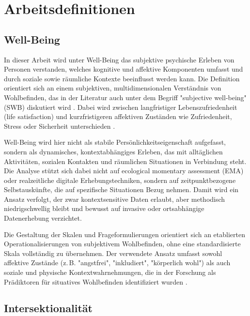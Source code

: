 \section*{Arbeitsdefinitionen}

\subsection*{Well-Being}

In dieser Arbeit wird unter Well-Being das subjektive psychische Erleben von Personen verstanden, welches kognitive und affektive Komponenten umfasst und durch soziale sowie räumliche Kontexte beeinflusst werden kann. Die Definition orientiert sich an einem subjektiven, multidimensionalen Verständnis von Wohlbefinden, das in der Literatur auch unter dem Begriff "subjective well-being" (SWB) diskutiert wird \parencite{diener2009, kahnemanKrueger2006}. Dabei wird zwischen langfristiger Lebenszufriedenheit (life satisfaction) und kurzfristigeren affektiven Zuständen wie Zufriedenheit, Stress oder Sicherheit unterschieden \parencite{schwanenWellBeingContextEveryday2014}.

Well-Being wird hier nicht als stabile Persönlichkeitseigenschaft aufgefasst, sondern als dynamisches, kontextabhängiges Erleben, das mit alltäglichen Aktivitäten, sozialen Kontakten und räumlichen Situationen in Verbindung steht. Die Analyse stützt sich dabei nicht auf ecological momentary assessment (EMA) oder realzeitliche digitale Erhebungstechniken, sondern auf zeitpunktbezogene Selbstauskünfte, die auf spezifische Situationen Bezug nehmen. Damit wird ein Ansatz verfolgt, der zwar kontextsensitive Daten erlaubt, aber methodisch niedrigschwellig bleibt und bewusst auf invasive oder ortsabhängige Datenerhebung verzichtet.

Die Gestaltung der Skalen und Frageformulierungen orientiert sich an etablierten Operationalisierungen von subjektivem Wohlbefinden, ohne eine standardisierte Skala vollständig zu übernehmen. Der verwendete Ansatz umfasst sowohl affektive Zustände (z. B. "angstfrei", "inkludiert", "körperlich wohl") als auch soziale und physische Kontextwahrnehmungen, die in der Forschung als Prädiktoren für situatives Wohlbefinden identifiziert wurden \parencite{bautistaWhatWellbeingScoping2023, schwanenWellBeingContextEveryday2014}.

\subsection*{Intersektionalität}

